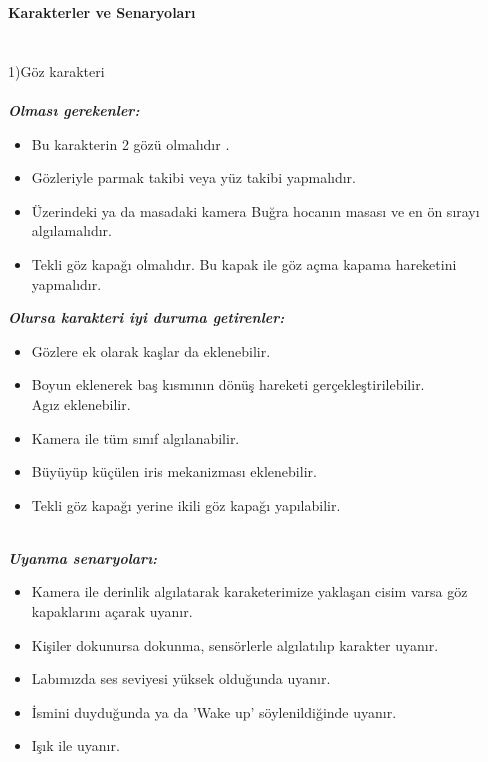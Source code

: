 \documentclass[11pt]{article}
\begin{document}
\textbf{{\Huge Karakterler ve Senaryoları}}
\\\\\\
{\Large 1)Göz karakteri}
\\\\
\textbf{\textit{Olması gerekenler:}}\\
\begin{itemize}
\item Bu karakterin 2 gözü olmalıdır .\\ \item Gözleriyle parmak takibi veya yüz takibi yapmalıdır.\\ 

\item Üzerindeki ya da masadaki kamera Buğra hocanın masası ve en ön sırayı algılamalıdır.\\
\item Tekli göz kapağı olmalıdır. 
Bu kapak ile göz açma kapama hareketini yapmalıdır.\\
\end{itemize}
\textbf{\textit{Olursa karakteri iyi duruma getirenler:}}\\
\begin{itemize}
\item Gözlere ek olarak kaşlar da eklenebilir.\\
\item Boyun eklenerek baş kısmının dönüş hareketi gerçekleştirilebilir.\\
Agız eklenebilir.\\
\item Kamera ile tüm sınıf algılanabilir.\\
\item Büyüyüp küçülen iris mekanizması eklenebilir.\\
\item Tekli göz kapağı yerine ikili göz kapağı yapılabilir.\\\\
\end{itemize}
\textbf{\textit{Uyanma senaryoları:}}\\
\begin{itemize}
\item Kamera ile derinlik algılatarak karaketerimize yaklaşan cisim varsa göz kapaklarını açarak uyanır.\\
\item Kişiler dokunursa dokunma, sensörlerle algılatılıp karakter uyanır.\\
\item Labımızda ses seviyesi yüksek olduğunda uyan{\i}r.\\
\item İsmini duyduğunda ya da 'Wake up' söylenildiğinde uyanır.\\
\item Işık ile uyanır.\\\\
\end{itemize}
\end{document}

